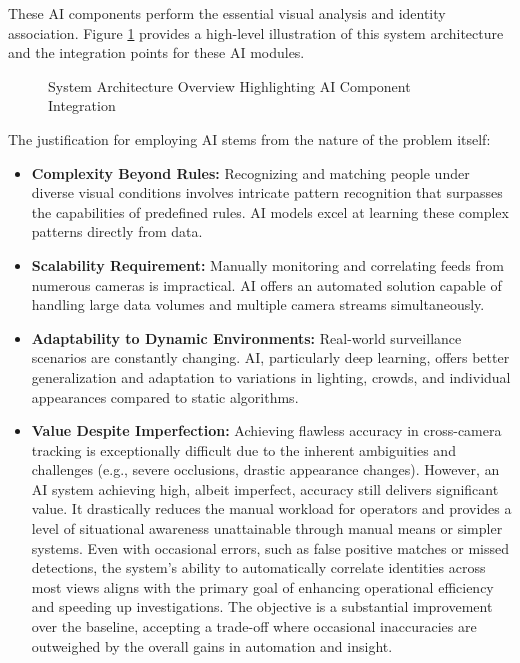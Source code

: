 These AI components perform the essential visual analysis and identity association. Figure \ref{fig:system_architecture} provides a high-level illustration of this system architecture and the integration points for these AI modules.
\begin{figure}[!htb] %
    \centering
    \caption{System Architecture Overview Highlighting AI Component Integration}
    \label{fig:system_architecture} %
\end{figure}
\clearpage %
The justification for employing AI stems from the nature of the problem itself:
\begin{itemize}
    \item \textbf{Complexity Beyond Rules:} Recognizing and matching people under diverse visual conditions involves intricate pattern recognition that surpasses the capabilities of predefined rules. AI models excel at learning these complex patterns directly from data.
    \item \textbf{Scalability Requirement:} Manually monitoring and correlating feeds from numerous cameras is impractical. AI offers an automated solution capable of handling large data volumes and multiple camera streams simultaneously.
    \item \textbf{Adaptability to Dynamic Environments:} Real-world surveillance scenarios are constantly changing. AI, particularly deep learning, offers better generalization and adaptation to variations in lighting, crowds, and individual appearances compared to static algorithms.
    \item \textbf{Value Despite Imperfection:} Achieving flawless accuracy in cross-camera tracking is exceptionally difficult due to the inherent ambiguities and challenges (e.g., severe occlusions, drastic appearance changes). However, an AI system achieving high, albeit imperfect, accuracy still delivers significant value. It drastically reduces the manual workload for operators and provides a level of situational awareness unattainable through manual means or simpler systems. Even with occasional errors, such as false positive matches or missed detections, the system's ability to automatically correlate identities across most views aligns with the primary goal of enhancing operational efficiency and speeding up investigations. The objective is a substantial improvement over the baseline, accepting a trade-off where occasional inaccuracies are outweighed by the overall gains in automation and insight.
\end{itemize}

